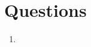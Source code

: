 \documentclass{article}
\begin{document}
\clearpage

\section{Questions}

\begin{enumerate}[label*=6.\arabic*]
\item
\end{enumerate}
\end{document}
